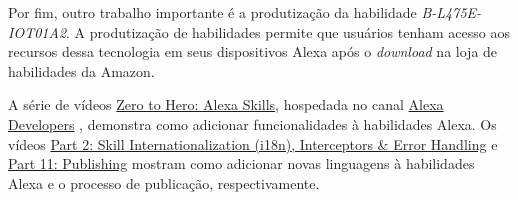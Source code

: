 Por fim, outro trabalho importante é a produtização da habilidade \textit{B-L475E-IOT01A2}. A produtização de habilidades permite que usuários tenham acesso aos recursos dessa tecnologia em seus dispositivos Alexa após o \textit{download} na loja de habilidades da Amazon.

A série de vídeos \href{https://www.youtube.com/playlist?list=PLdZn93YfA_1ZP1WFkz6bm08v3zFfWwfGW}{Zero to Hero: Alexa Skills}, hospedada no canal \href{https://www.youtube.com/@AlexaDevelopers}{Alexa Developers} \nocite{ref:045}, demonstra como adicionar funcionalidades à habilidades Alexa. Os vídeos \href{https://www.youtube.com/watch?v=NXVmHWZZcjw&list=PLdZn93YfA_1ZP1WFkz6bm08v3zFfWwfGW&index=2}{Part 2: Skill Internationalization (i18n), Interceptors \& Error Handling} \nocite{ref:046} e \href{https://www.youtube.com/watch?v=I0fxuQQkLYg&list=PLdZn93YfA_1ZP1WFkz6bm08v3zFfWwfGW&index=11}{Part 11: Publishing} \nocite{ref:047} mostram como adicionar novas linguagens à habilidades Alexa e o processo de publicação, respectivamente.
